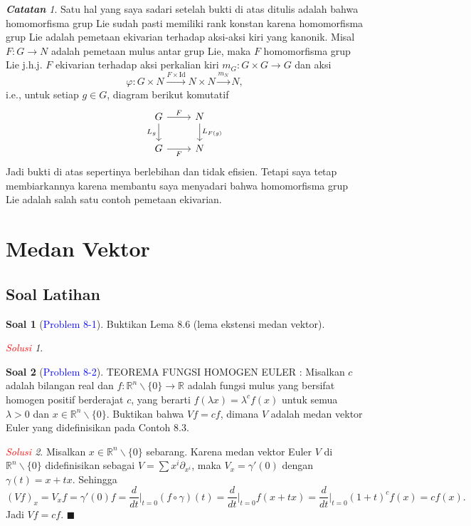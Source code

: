 \documentclass[11pt]{article}
\theoremstyle{definition}
\newtheorem*{problem}{Soal}
\theoremstyle{remark}
\newtheorem*{remark}{\textbf{Catatan}}
\newtheorem*{solution}{\textcolor{red}{Solusi}}
\newcommand{\er}{\mathbb{R}}            %
\newcommand{\Rn}{\mathbb{R}^n}          %
\newcommand{\Id}{\text{Id}}                 %
\begin{document}
\begin{remark}
Satu hal yang saya sadari setelah bukti di atas ditulis adalah bahwa homomorfisma grup Lie sudah pasti memiliki rank konstan karena homomorfisma grup Lie adalah pemetaan ekivarian terhadap aksi-aksi kiri yang kanonik. Misal $F: G \to N$ adalah pemetaan mulus antar grup Lie, maka $F$ homomorfisma grup Lie j.h.j. $F$ ekivarian terhadap aksi perkalian kiri $m_G :G \times G \to G$ dan aksi 
$$
\varphi : G \times N \xrightarrow{F \times \Id} N \times N \xrightarrow{m_N} N,
$$
i.e., untuk setiap $g \in G$, diagram berikut komutatif
\[
\begin{tikzcd}
G  \arrow[rightarrow]{r}{F} \arrow[swap]{d}{L_g} & N   \arrow[rightarrow]{d}{L_{F(g)}} \\
G \arrow[swap,rightarrow]{r}{F}& N
\end{tikzcd}
\]
Jadi bukti di atas sepertinya berlebihan dan tidak efisien. Tetapi saya tetap membiarkannya karena membantu saya menyadari bahwa homomorfisma grup Lie adalah salah satu contoh pemetaan ekivarian.
\end{remark}

\section{Medan Vektor}
\subsection{Soal Latihan}
\begin{problem}[\textcolor{blue}{Problem 8-1}]
Buktikan Lema 8.6 (lema ekstensi medan vektor).
\end{problem}
\begin{solution}
\end{solution}


\begin{problem}[\textcolor{blue}{Problem 8-2}]
TEOREMA FUNGSI HOMOGEN EULER : Misalkan $c$ adalah bilangan real dan $f: \Rn \smallsetminus \{0\} \to \er$ adalah fungsi mulus yang bersifat homogen positif berderajat $c$, yang berarti $f(\lambda x) = \lambda^c f(x)$ untuk semua $\lambda >0$ dan  $x \in \Rn \smallsetminus \{0\}$. Buktikan bahwa $Vf = cf$, dimana $V$ adalah medan vektor Euler yang didefinisikan pada Contoh 8.3.
\end{problem}
\begin{solution}
Misalkan $x \in \Rn \smallsetminus \{0\}$ sebarang. Karena medan vektor Euler $V$ di $\Rn\smallsetminus \{0\}$ didefinisikan sebagai $V = \sum x^i \partial_{x^i}$, maka $V_x = \gamma'(0)$ dengan $\gamma(t)=x+tx$. Sehingga
$$
(Vf)_x = V_xf = \gamma'(0)f = \frac{d}{dt}\Big|_{t=0} (f \circ \gamma) (t)=\frac{d}{dt}\Big|_{t=0} f(x+tx) =\frac{d}{dt}\Big|_{t=0} (1+t)^cf(x) = cf(x). 
$$
Jadi $Vf=cf$. $\blacksquare$
\end{solution}
\end{document}
